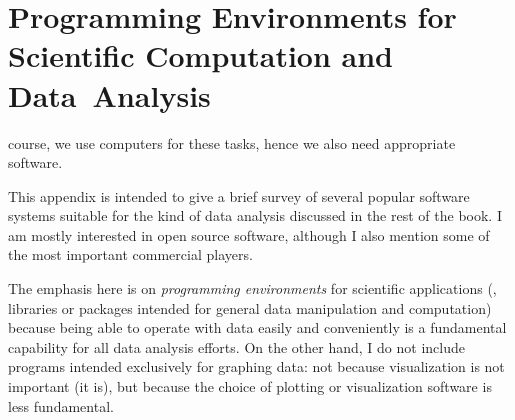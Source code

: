  
 
\chapter{Programming Environments for Scientific Computation and Data~Analysis}{}{}
\label{app:tools}

% 
% 


\vspace*{-6pt}
 course, we use computers for these tasks,
hence we also need appropriate software.

This appendix is intended to give a brief survey of several popular
software systems suitable for the kind of data analysis discussed in
the rest of the book. I am mostly interested in open source software,
although I also mention some of the most important commercial players.

The emphasis here is on \emph{programming environments} for scientific
applications (\ie, libraries or packages intended for general data
manipulation and computation) because being able to operate with data
easily and conveniently is a fundamental capability for all data
analysis efforts. On the other hand, I do not include programs
intended exclusively for graphing data: not because visualization is
not important (it is), but because the choice of plotting or
visualization software is less fundamental.

